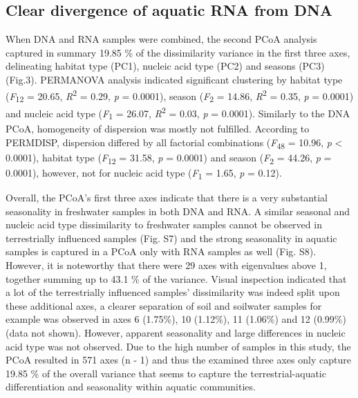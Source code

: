 \documentclass[12pt,a4paper]{article} %
\begin{document}
\subsection*{Clear divergence of aquatic RNA from DNA}
When DNA and RNA samples were combined, the second PCoA analysis captured in summary 19.85 \% of the dissimilarity variance in the first three axes, delineating habitat type (PC1), nucleic acid type (PC2) and seasons (PC3)(Fig.3). PERMANOVA analysis indicated significant clustering by habitat type (\textit{F}\textsubscript{12} = 20.65, \textit{R}\textsuperscript{2} = 0.29, \textit{p} = 0.0001), season (\textit{F}\textsubscript{2} = 14.86, \textit{R}\textsuperscript{2} = 0.35, \textit{p} = 0.0001) and nucleic acid type (\textit{F}\textsubscript{1} = 26.07, \textit{R}\textsuperscript{2} = 0.03, \textit{p} = 0.0001). Similarly to the DNA PCoA, homogeneity of dispersion was mostly not fulfilled. According to PERMDISP, dispersion differed by all factorial combinations (\textit{F}\textsubscript{48} = 10.96, \textit{p} < 0.0001), habitat type (\textit{F}\textsubscript{12} = 31.58, \textit{p} = 0.0001) and season (\textit{F}\textsubscript{2} = 44.26, \textit{p} = 0.0001), however, not for nucleic acid type (\textit{F}\textsubscript{1} = 1.65, \textit{p} = 0.12).

Overall, the PCoA's first three axes indicate that there is a very substantial seasonality in freshwater samples in both DNA and RNA. A similar seasonal and nucleic acid type dissimilarity to freshwater samples cannot be observed in terrestrially influenced samples (Fig. S7) and the strong seasonality in aquatic samples is captured in a PCoA only with RNA samples as well (Fig. S8). However, it is noteworthy that there were 29 axes with eigenvalues above 1, together summing up to 43.1 \% of the variance. Visual inspection indicated that a lot of the terrestrially influenced samples' dissimilarity was indeed split upon these additional axes, a clearer separation of soil and soilwater samples for example was observed in axes 6 (1.75\%), 10 (1.12\%), 11 (1.06\%) and 12 (0.99\%)(data not shown). However, apparent seasonality and large differences in nucleic acid type was not observed. Due to the high number of samples in this study, the PCoA resulted in 571 axes (n - 1) and thus the examined three axes only capture 19.85 \% of the overall variance that seems to capture the terrestrial-aquatic differentiation and seasonality within aquatic communities.
\end{document}
